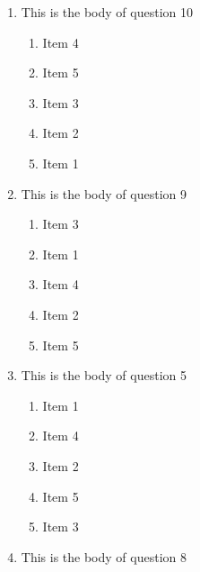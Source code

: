 \documentclass[amsfonts,bezier,leqno,fleqn,12pt,a4paper]{article}
\begin{document}
{{{\begin{large}
\begin{enumerate}
\begin{enumerate}
\item  Item 4
\item  Item 5
\item  Item 2
\item  Item 1
\item  Item 3

\end{enumerate}
\newpage


\item This is the body of question 10
\vspace {0.3in}
\setcounter{equation}{0}

\begin{enumerate}
\item  Item 4
\item  Item 5
\item  Item 3
\item  Item 2
\item  Item 1

\end{enumerate}

\vspace {3.5cm}


\item This is the body of question 9
\vspace {0.3in}
\setcounter{equation}{0}

\begin{enumerate}
\item  Item 3
\item  Item 1
\item  Item 4
\item  Item 2
\item  Item 5

\end{enumerate}
\newpage


\item This is the body of question 5
\vspace {0.3in}
\setcounter{equation}{0}

\begin{enumerate}
\item  Item 1
\item  Item 4
\item  Item 2
\item  Item 5
\item  Item 3

\end{enumerate}

\vspace {3.5cm}


\item This is the body of question 8
\vspace {0.3in}
\setcounter{equation}{0}


\end{enumerate}
\end{large}}}}
\end{document}
